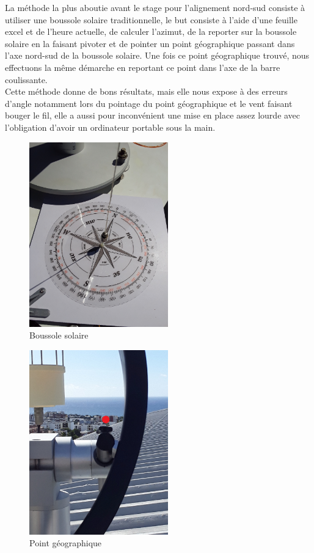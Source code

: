 \documentclass[12pt,a4paper]{article}
\begin{document}
\begin{flushleft}
La méthode la plus aboutie avant le stage pour l'alignement nord-sud consiste à utiliser une boussole solaire traditionnelle, le but consiste à l'aide d'une feuille excel et de l'heure actuelle, de calculer l'azimut, de la reporter sur la boussole solaire en la faisant pivoter et de pointer un point géographique passant dans l'axe nord-sud de la boussole solaire. Une fois ce point géographique trouvé, nous effectuons la même démarche en reportant ce point dans l'axe de la barre coulissante.\\

Cette méthode donne de bons résultats, mais elle nous expose à des erreurs d'angle notamment lors du pointage du point géographique et le vent faisant bouger le fil, elle a aussi pour inconvénient une mise en place assez lourde avec l'obligation d'avoir un ordinateur portable sous la main.\\	

\begin{figure}[H]
\centering
\includegraphics[width=6cm, angle=-90]{image/montage/5.jpg} 
\caption{Boussole solaire}
\end{figure}

\begin{figure}[H]
\centering
\includegraphics[width=6cm]{image/montage/6.jpg} 
\caption{Point géographique}
\end{figure}


\end{flushleft}
\end{document}

